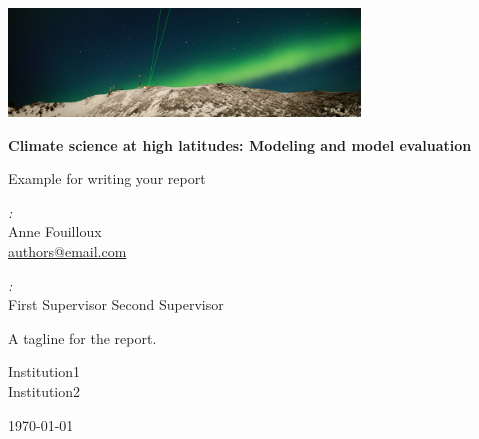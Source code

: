 \documentclass[10pt,parskip=half,
	toc=sectionentrywithdots,
	bibliography=totocnumbered,
	captions=tableheading,numbers=noendperiod]{scrartcl}
\begin{document}
		\begin{titlepage}
	\begin{flushright}
		\includegraphics[width=0.7\textwidth]{report_example_files/NEGI2018.png}
	\end{flushright}

	\begin{center}

	\vspace*{1cm}

	\Huge\textbf{Climate science at high latitudes: Modeling and model evaluation}

	\vspace{0.5cm}\LARGE{Example for writing your report}

	\vspace{1.5cm}

	\begin{minipage}{0.8\textwidth}
		\begin{center}
		\begin{minipage}{0.39\textwidth}
		\begin{flushleft} \Large
		\emph{:}\\Anne Fouilloux\\\href{mailto:authors@email.com}{authors@email.com}
		\end{flushleft}
		\end{minipage}
		\hspace{\fill}
		\begin{minipage}{0.39\textwidth}
		\begin{flushright} \Large\emph{:} \\
			  First Supervisor
			  Second Supervisor
		\end{flushright}
		\end{minipage}
		\end{center}
	\end{minipage}

	\vfill

	\begin{minipage}{0.8\textwidth}
	\begin{center}\LARGE{A tagline for the report.}
	\end{center}
	\end{minipage}

	\vspace{0.8cm}
		  \LARGE{Institution1}\\
		  \LARGE{Institution2}\\

	\vspace{0.4cm}

	\today

	\end{center}
	\end{titlepage}
\end{document}
